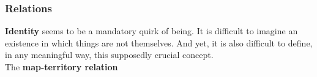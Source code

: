 \subsubsection{Relations}


\textbf{Identity} seems to be a mandatory quirk of being. It is difficult to imagine an existence in which things are not themselves. And yet, it is also difficult to define, in any meaningful way, this supposedly crucial concept. \\



The \textbf{map-territory relation} \\






